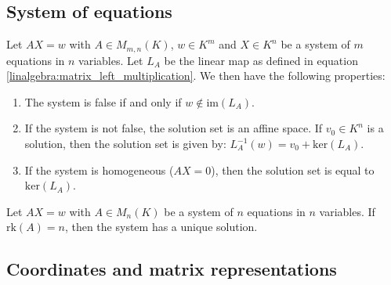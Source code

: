 \subsection{System of equations}

	\begin{theorem}\label{linalgebra:matrix_and_equations}
	        Let $AX=w$ with $A\in M_{m,n}(K)$, $w\in K^m$ and $X\in K^n$ be a system of $m$ equations in $n$ variables. Let $L_A$ be the linear map as defined in equation \ref{linalgebra:matrix_left_multiplication}. We then have the following properties:
        	\begin{enumerate}
			\item The system is false if and only if $w\not\in\text{im}(L_A)$.
        		\item If the system is not false, the solution set is an affine space. If $v_0\in K^n$ is a solution, then the solution set is given by: $L_A^{-1}(w)=v_0+\text{ker}(L_A)$.
		        \item If the system is homogeneous ($AX=0$), then the solution set is equal to $\text{ker}(L_A)$.
		\end{enumerate}
	\end{theorem}
	\begin{theorem}[Uniqueness]\label{linalgebra:rank_unique_solution}
	        Let $AX=w$ with $A\in M_n(K)$ be a system of $n$ equations in $n$ variables. If $\text{rk}(A)=n$, then the system has a unique solution.
	\end{theorem}
    
\subsection{Coordinates and matrix representations}

        
